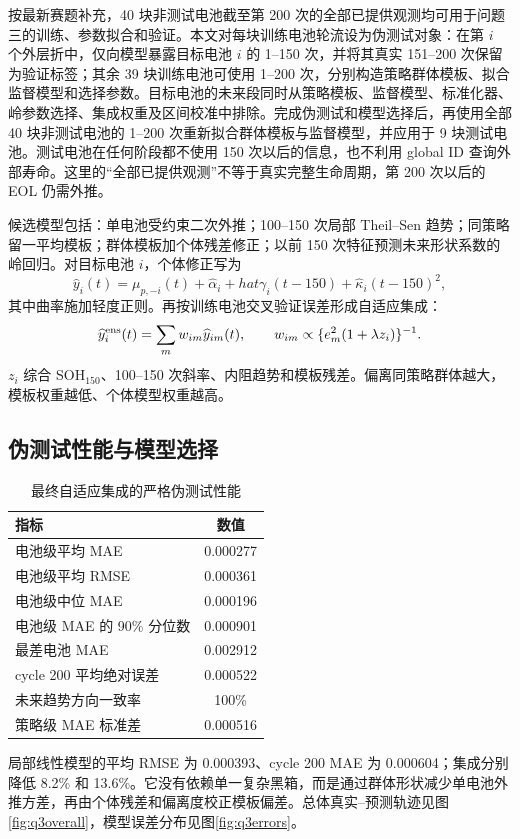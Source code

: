 \documentclass[UTF8,a4paper,zihao=-4]{ctexart}
\begin{document}
按最新赛题补充，40 块非测试电池截至第 200 次的全部已提供观测均可用于问题三的训练、参数拟合和验证。本文对每块训练电池轮流设为伪测试对象：在第 $i$ 个外层折中，仅向模型暴露目标电池 $i$ 的 1--150 次，并将其真实 151--200 次保留为验证标签；其余 39 块训练电池可使用 1--200 次，分别构造策略群体模板、拟合监督模型和选择参数。目标电池的未来段同时从策略模板、监督模型、标准化器、岭参数选择、集成权重及区间校准中排除。完成伪测试和模型选择后，再使用全部 40 块非测试电池的 1--200 次重新拟合群体模板与监督模型，并应用于 9 块测试电池。测试电池在任何阶段都不使用 150 次以后的信息，也不利用 global ID 查询外部寿命。这里的“全部已提供观测”不等于真实完整生命周期，第 200 次以后的 EOL 仍需外推。

候选模型包括：单电池受约束二次外推；100--150 次局部 Theil--Sen 趋势；同策略留一平均模板；群体模板加个体残差修正；以前 150 次特征预测未来形状系数的岭回归。对目标电池 $i$，个体修正写为
\[
  \widehat y_i(t)=\mu_{p,-i}(t)+\hat\alpha_i+hat\gamma_i(t-150)+\hat\kappa_i(t-150)^2,
\]
其中曲率施加轻度正则。再按训练电池交叉验证误差形成自适应集成：
\[
  \widehat y_i^{\rm ens}(t)=\sum_m w_{im}\widehat y_{im}(t),\qquad
  w_{im}\propto\{e_m^2(1+\lambda z_i)\}^{-1}.
\]
$z_i$ 综合 SOH$_{150}$、100--150 次斜率、内阻趋势和模板残差。偏离同策略群体越大，模板权重越低、个体模型权重越高。

\subsection{伪测试性能与模型选择}

\begin{table}[H]
\centering
\caption{最终自适应集成的严格伪测试性能}
\begin{tabular}{lc}
\toprule
指标 & 数值 \\
\midrule
电池级平均 MAE & 0.000277 \\
电池级平均 RMSE & 0.000361 \\
电池级中位 MAE & 0.000196 \\
电池级 MAE 的 90\% 分位数 & 0.000901 \\
最差电池 MAE & 0.002912 \\
cycle 200 平均绝对误差 & 0.000522 \\
未来趋势方向一致率 & 100\% \\
策略级 MAE 标准差 & 0.000516 \\
\bottomrule
\end{tabular}
\end{table}

局部线性模型的平均 RMSE 为 0.000393、cycle 200 MAE 为 0.000604；集成分别降低 8.2\% 和 13.6\%。它没有依赖单一复杂黑箱，而是通过群体形状减少单电池外推方差，再由个体残差和偏离度校正模板偏差。总体真实--预测轨迹见图\ref{fig:q3overall}，模型误差分布见图\ref{fig:q3errors}。
\end{document}
